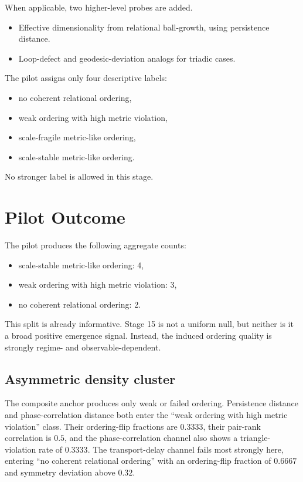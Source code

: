 \documentclass[11pt]{article}
\begin{document}
When applicable, two higher-level probes are added.
\begin{itemize}
\item Effective dimensionality from relational ball-growth, using persistence distance.
\item Loop-defect and geodesic-deviation analogs for triadic cases.
\end{itemize}

The pilot assigns only four descriptive labels:
\begin{itemize}
\item no coherent relational ordering,
\item weak ordering with high metric violation,
\item scale-fragile metric-like ordering,
\item scale-stable metric-like ordering.
\end{itemize}

No stronger label is allowed in this stage.

\section{Pilot Outcome}

The pilot produces the following aggregate counts:
\begin{itemize}
\item scale-stable metric-like ordering: 4,
\item weak ordering with high metric violation: 3,
\item no coherent relational ordering: 2.
\end{itemize}

This split is already informative. Stage 15 is not a uniform null, but neither is it a broad positive emergence signal. Instead, the induced ordering quality is strongly regime- and observable-dependent.

\subsection{Asymmetric density cluster}

The composite anchor produces only weak or failed ordering. Persistence distance and phase-correlation distance both enter the ``weak ordering with high metric violation'' class. Their ordering-flip fractions are \(0.3333\), their pair-rank correlation is \(0.5\), and the phase-correlation channel also shows a triangle-violation rate of \(0.3333\). The transport-delay channel fails most strongly here, entering ``no coherent relational ordering'' with an ordering-flip fraction of \(0.6667\) and symmetry deviation above \(0.32\).
\end{document}
